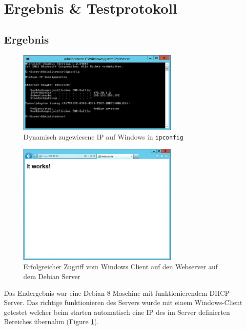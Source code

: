\documentclass[12pt,a4paper,twoside,titlepage]{article}
\begin{document}
        \section{Ergebnis \& Testprotokoll}

        \subsection{Ergebnis}

        \begin{figure}
          \center
          
          \includegraphics[width=8cm]{cmd_ipconfig_dynamic_ip}
          \caption{\label{dynip} Dynamisch zugewiesene IP auf Windows in \texttt{ipconfig}}
        \end{figure}

        \begin{figure}
          \center
          
          \includegraphics[width=8cm]{ie_web_example}
          \caption{\label{webserver} Erfolgreicher Zugriff vom Windows Client auf den Webserver auf dem Debian Server}
        \end{figure}
        
        Das Endergebnis war eine Debian 8 Maschine mit funktionierendem DHCP Server. Das richtige funktionieren des Servers wurde mit einem Windows-Client getestet welcher beim starten automatisch eine IP des im Server definierten Bereiches übernahm (Figure \ref{dynip}).
\end{document}
